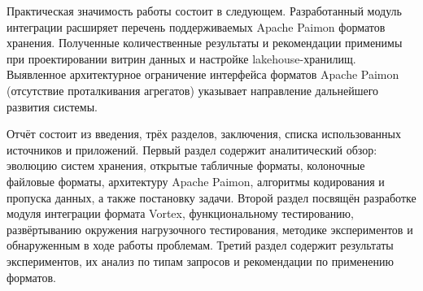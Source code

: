 Практическая значимость работы состоит в следующем. Разработанный модуль интеграции
расширяет перечень поддерживаемых Apache Paimon форматов хранения. Полученные количественные результаты
и рекомендации применимы при проектировании витрин данных и настройке
lakehouse-хранилищ. Выявленное архитектурное ограничение интерфейса форматов Apache
Paimon (отсутствие проталкивания агрегатов) указывает направление дальнейшего
развития системы.

Отчёт состоит из введения, трёх разделов, заключения, списка использованных
источников и приложений. Первый раздел содержит аналитический обзор: эволюцию систем
хранения, открытые табличные форматы, колоночные файловые форматы, архитектуру
Apache Paimon, алгоритмы кодирования и пропуска данных, а также постановку задачи.
Второй раздел посвящён разработке модуля интеграции формата Vortex, функциональному
тестированию, развёртыванию окружения нагрузочного тестирования, методике
экспериментов и обнаруженным в ходе работы проблемам. Третий раздел содержит
результаты экспериментов, их анализ по типам запросов и рекомендации по применению
форматов.
